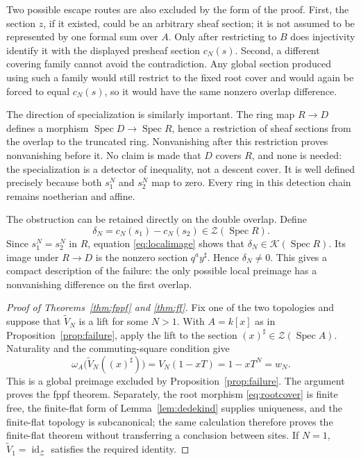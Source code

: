 \documentclass[11pt]{article}
\theoremstyle{definition}
\newcommand{\Spec}{\operatorname{Spec}}
\newcommand{\Zsh}{\mathcal Z}
\newcommand{\Ksh}{\mathcal K}
\newcommand{\sh}{\sharp}
\begin{document}
Two possible escape routes are also excluded by the form of the proof.
First, the section \(z\), if it existed, could be an arbitrary sheaf
section; it is not assumed to be represented by one formal sum over
\(A\).  Only after restricting to \(B\) does injectivity identify it with
the displayed presheaf section \(c_N(s)\).  Second, a different covering
family cannot avoid the contradiction.  Any global section produced using
such a family would still restrict to the fixed root cover and would again
be forced to equal \(c_N(s)\), so it would have the same nonzero overlap
difference.

The direction of specialization is similarly important.  The ring map
\(R\to D\) defines a morphism \(\Spec D\to\Spec R\), hence a restriction of
sheaf sections from the overlap to the truncated ring.  Nonvanishing after
this restriction proves nonvanishing before it.  No claim is made that
\(D\) covers \(R\), and none is needed: the specialization is a detector
of inequality, not a descent cover.
It is well defined precisely because both \(s_1^N\) and \(s_2^N\) map to
zero.  Every ring in this detection chain remains noetherian and affine.

The obstruction can be retained directly on the double overlap.  Define
\[
 \delta_N=c_N(s_1)-c_N(s_2)\in\Zsh(\Spec R).
 \tag{4.14}\label{eq:delta}
\]
Since \(s_1^N=s_2^N\) in \(R\), equation \eqref{eq:localimage} shows that
\(\delta_N\in\Ksh(\Spec R)\).  Its image under \(R\to D\) is the nonzero
section \(q^a y^\sh\).  Hence \(\delta_N\ne0\).  This gives a compact
description of the failure: the only possible local preimage has a
nonvanishing difference on the first overlap.

\begin{proof}[Proof of Theorems~\ref{thm:fppf} and \ref{thm:ff}]
Fix one of the two topologies and suppose that
\(\widetilde V_N\) is a lift for some \(N>1\).  With \(A=k[x]\) as in
Proposition~\ref{prop:failure}, apply the lift to the section
\((x)^\sh\in\Zsh(\Spec A)\).  Naturality and the commuting-square
condition give
\[
 \omega_A\bigl(\widetilde V_N((x)^\sh)\bigr)
  =V_N(1-xT)=1-xT^N=w_N.
\]
This is a global preimage excluded by Proposition~\ref{prop:failure}.
The argument proves the fppf theorem.  Separately, the root morphism
\eqref{eq:rootcover} is finite free, the finite-flat form of
Lemma~\ref{lem:dedekind} supplies uniqueness, and the finite-flat topology
is subcanonical; the same calculation therefore proves the finite-flat
theorem without transferring a conclusion between sites.  If \(N=1\),
\(\widetilde V_1=\operatorname{id}_{\Zsh}\) satisfies the required
identity.
\end{proof}
\end{document}
